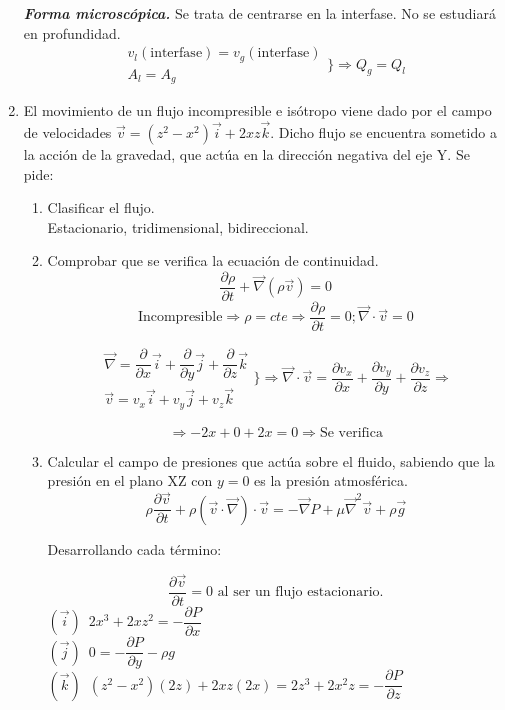 \begin{enumerate}
\textit{\textbf{Forma microscópica.}}
	Se trata de centrarse en la interfase. No se estudiará en profundidad.
	\[\begin{matrix}
		v_l(\text{interfase}) = v_g(\text{interfase})\\
		A_l = A_g
	\end{matrix}
	\Biggr\} \Rightarrow Q_g = Q_l
	\]
	
\black
\item El movimiento de un flujo incompresible e isótropo viene dado por el campo de velocidades
$\vec{v} = (z^2 - x^2) \vec{i} + 2xz\vec{k}$. Dicho flujo se encuentra sometido a la acción de la gravedad, que actúa en la dirección negativa del eje Y. Se pide:
\begin{enumerate}
	\item Clasificar el flujo.\\
	\blue Estacionario, tridimensional, bidireccional.\\
	\black
	\item Comprobar que se verifica la ecuación de continuidad.\\
	\blue
		\[\dfrac{\partial \rho}{\partial t} + \vec{\nabla}(\rho \vec{v}) = 0\]
		\[\text{Incompresible}\Rightarrow \rho = cte \Rightarrow \dfrac{\partial \rho}{\partial t} = 0; \vec{\nabla} \cdot \vec{v} = 0\]
		
		\[
			\begin{matrix}
				\vec{\nabla} = 
					\dfrac{\partial}{\partial x} \vec{i} +
					\dfrac{\partial}{\partial y} \vec{j} +
					\dfrac{\partial}{\partial z} \vec{k}\\
				\vec{v} = v_x \vec{i} + v_y \vec{j} + v_z \vec{k}
			\end{matrix}
			\Biggr\} \Rightarrow
			\vec{\nabla}\cdot\vec{v} = 
				\dfrac{\partial v_x}{\partial x} + 
				\dfrac{\partial v_y}{\partial y} + 
				\dfrac{\partial v_z}{\partial z}	
			\Rightarrow
		\]
		
		\[\Rightarrow -2x+0+2x = 0 \Rightarrow \text{Se verifica}\]
		
	\black
	\item Calcular el campo de presiones que actúa sobre el fluido, sabiendo que la presión en el plano XZ con $y=0$ es la presión atmosférica.
	\blue
		\[
			\rho \dfrac{\partial \vec{v}}{\partial t} + \rho (\vec{v} \cdot \vec{\nabla}) \cdot \vec{v} =
				- \vec{\nabla} P + \mu \vec{\nabla}^2 \vec{v} + \rho \vec{g}
		\]
		
		Desarrollando cada término:
		
		\[\dfrac{\partial \vec{v}}{\partial t} = 0 \text{ al ser un flujo estacionario.}\]
		$(\vec{i})\,\,\,2x^3 + 2xz^2 = -\dfrac{\partial P}{\partial x}$\\
		$(\vec{j})\,\,\,0 = -\dfrac{\partial P}{\partial y} - \rho g$\\
		$(\vec{k})\,\,\,(z^2 - x^2)(2z) + 2xz(2x) = 2z^3 + 2x^2z = -\dfrac{\partial P}{\partial z}$\\
		

\end{enumerate}
\end{enumerate}
